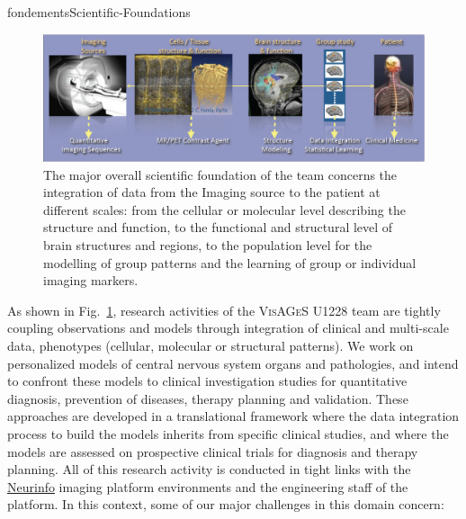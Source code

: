 \documentclass{ra2018}
\begin{document}
\begin{module}{fondements}{Scientific-Foundations}{}
        \begin{figure}[htbp]
          \centerline{
            \includegraphics[width=\textwidth]{IMG/OverallObjectives}
          }
          \caption{
            The major overall scientific foundation of the team concerns the
            integration of data from the Imaging source to the patient at different
            scales: from the cellular or molecular level describing the structure and
            function, to the functional and structural level of brain structures and
            regions, to the population level for the modelling of group patterns and
            the learning of group or individual imaging markers.
          }
          \label{fig-objectives}
        \end{figure}
        
        As shown in Fig.~\ref{fig-objectives}, research activities of the
        \textsc{VisAGeS} U1228 team are tightly coupling observations and models through
        integration of clinical and multi-scale data, phenotypes (cellular, molecular
        or structural patterns). We work on personalized models of central nervous
        system organs and pathologies, and intend to confront these models to clinical
        investigation studies for quantitative diagnosis, prevention of diseases,
        therapy planning and validation. These approaches are developed in a
        translational framework where the data integration process to build the models
        inherits from specific clinical studies, and where the models are assessed on
        prospective clinical trials for diagnosis and therapy planning. All of this
        research activity is conducted in tight links with the
        \href{http://www.neurinfo.org}{Neurinfo} imaging platform environments and the
        engineering staff of the platform. In this context, some of our major
        challenges in this domain  concern:
        

\end{module}
\end{document}
